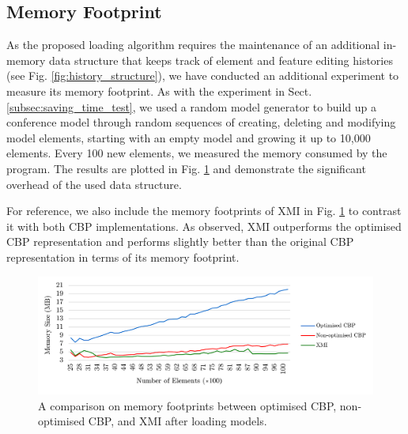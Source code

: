 \documentclass{llncs}
\begin{document}
         
\subsection{Memory Footprint}
\label{subsec:memory_consumption}
As the proposed loading algorithm requires the maintenance of an additional in-memory data structure that keeps track of element and feature editing histories (see Fig. \ref{fig:history_structure}), we have conducted an additional experiment to measure its memory footprint. As with the experiment in Sect. \ref{subsec:saving_time_test}, we used a random model generator to build up a conference model through random sequences of creating, deleting and modifying model elements, starting with an empty model and growing it up to 10,000 elements. Every 100 new elements, we measured the memory consumed by the program. The results are plotted in Fig. \ref{fig:memory_ocbp_cbp_xmi} and demonstrate the significant overhead of the used data structure.

For reference, we also include the memory footprints of XMI in Fig. \ref{fig:memory_ocbp_cbp_xmi} to contrast it with both CBP implementations. As observed, XMI outperforms the optimised CBP representation and performs slightly better than the original CBP representation in terms of its memory footprint. 

\begin{figure}[b]	
\centering
\includegraphics[width=\linewidth]{memory_ocbp_cbp_xmi}
		\caption{A comparison on memory footprints between optimised CBP, non-optimised CBP, and XMI after loading models.}\label{fig:memory_ocbp_cbp_xmi}
\end{figure}
\end{document}
